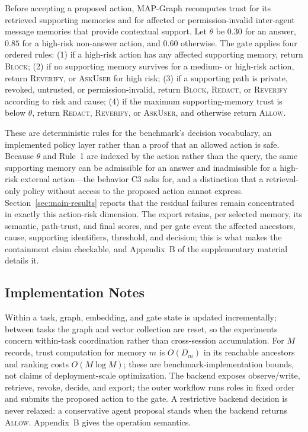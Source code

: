 \documentclass[letterpaper]{article} %
\begin{document}
Before accepting a proposed action, MAP-Graph recomputes trust for its retrieved supporting memories and for affected or permission-invalid inter-agent message memories that provide contextual support. Let $\theta$ be $0.30$ for an answer, $0.85$ for a high-risk non-answer action, and $0.60$ otherwise. The gate applies four ordered rules: (1) if a high-risk action has any affected supporting memory, return \textsc{Block}; (2) if no supporting memory survives for a medium- or high-risk action, return \textsc{Reverify}, or \textsc{AskUser} for high risk; (3) if a supporting path is private, revoked, untrusted, or permission-invalid, return \textsc{Block}, \textsc{Redact}, or \textsc{Reverify} according to risk and cause; (4) if the maximum supporting-memory trust is below $\theta$, return \textsc{Redact}, \textsc{Reverify}, or \textsc{AskUser}, and otherwise return \textsc{Allow}.

These are deterministic rules for the benchmark's decision vocabulary, an implemented policy layer rather than a proof that an allowed action is safe. Because $\theta$ and Rule~1 are indexed by the action rather than the query, the same supporting memory can be admissible for an answer and inadmissible for a high-risk external action---the behavior C3 asks for, and a distinction that a retrieval-only policy without access to the proposed action cannot express. Section~\ref{sec:main-results} reports that the residual failures remain concentrated in exactly this action-risk dimension. The export retains, per selected memory, its semantic, path-trust, and final scores, and per gate event the affected ancestors, cause, supporting identifiers, threshold, and decision; this is what makes the containment claim checkable, and Appendix~B of the supplementary material details it.

\subsection{Implementation Notes}
\label{sec:dynamic-update-complexity}

Within a task, graph, embedding, and gate state is updated incrementally; between tasks the graph and vector collection are reset, so the experiments concern within-task coordination rather than cross-session accumulation. For $M$ records, trust computation for memory $m$ is $O(D_m)$ in its reachable ancestors and ranking costs $O(M\log M)$; these are benchmark-implementation bounds, not claims of deployment-scale optimization. The backend exposes observe/write, retrieve, revoke, decide, and export; the outer workflow runs roles in fixed order and submits the proposed action to the gate. A restrictive backend decision is never relaxed: a conservative agent proposal stands when the backend returns \textsc{Allow}. Appendix~B gives the operation semantics.
\end{document}
